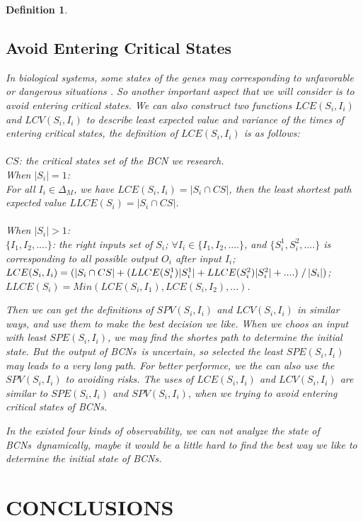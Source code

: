 \documentclass[conference]{IEEEtran} %
\newtheorem{definition}{Definition}
\def \BCNs {{\em BCNs}}
\begin{document}
\begin{definition}
\subsection{Avoid Entering Critical States}
In biological systems, some states of the genes may corresponding to unfavorable or dangerous situations \cite{Li2014Controllability}. So another important aspect that we will consider is to avoid entering critical states. We can also construct two functions $LCE(S_i, I_i)$ and $LCV(S_i, I_i)$ to describe least expected value and variance of the times of entering critical states, the definition of $LCE(S_i, I_i)$ is as follows:\\
\\$CS$: the critical states set of the {\em BCN} we research.\\
When $|S_i|=1$:\\ 
For all $I_i \in \Delta_M$, we have $LCE(S_i, I_i)=|S_i \cap CS |$, then the least shortest path  expected value $LLCE(S_i)=|S_i \cap CS |$. \\
\\
When $|S_i|>1$:\\ 
$\{I_1,I_2,....\}$: the right inputs set of $S_i$; $\forall I_i \in \{I_1,I_2,....\}$, and $\{S_i^1,S_i^2,....\}$ is corresponding to all possible output $O_i$ after input $I_i$; $LCE(S_i, I_i)=(|S_i \cap CS | + (LLCE(S_i^1)|S_i^1|+LLCE(S_i^2)|S_i^2|+....)\left. \right/ |S_i|)$; $LLCE(S_i)= Min(LCE(S_i, I_1),LCE(S_i, I_2),...)$.

Then we can get the definitions of $SPV(S_i, I_i)$ and $LCV(S_i, I_i)$ in similar ways, and use them to make the best decision we like. When we choos an input with least $SPE(S_i, I_i)$, we may find the shortes path to determine the initial state. But the output of \BCNs\ is uncertain, so selected the least $SPE(S_i, I_i)$ may leads to a very long path. For better performce, we the can also use the $SPV(S_i, I_i)$ to avoiding risks. The uses of $LCE(S_i, I_i)$ and $LCV(S_i, I_i)$ are similar to $SPE(S_i, I_i)$ and $SPV(S_i, I_i)$, when we trying to avoid entering critical states of {\em BCNs}.

In the existed four kinds of observability, we can not analyze the state of \BCNs\ dynamically, maybe it would be a little hard to find the best way we like to determine the initial state of {\em BCNs}.
\section{CONCLUSIONS}


\end{definition}
\end{document}
